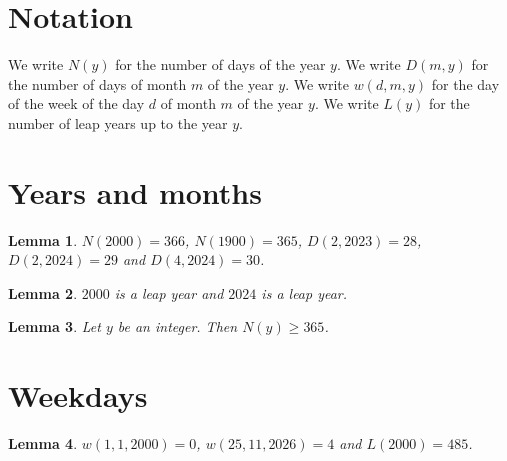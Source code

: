 \documentclass{article}
\newtheorem{lemma}{Lemma}
\begin{document}
\section{Notation}

We write $N(y)$ for the number of days of the year $y$.
We write $D(m,y)$ for the number of days of month $m$ of the year $y$.
We write $w(d,m,y)$ for the day of the week of the day $d$ of month $m$ of the year $y$.
We write $L(y)$ for the number of leap years up to the year $y$.

\section{Years and months}

\begin{lemma}\label{years}
$N(2000)=366$, $N(1900)=365$, $D(2,2023)=28$, $D(2,2024)=29$ and $D(4,2024)=30$.
\end{lemma}

\begin{lemma}\label{leap}
$2000$ is a leap year and $2024$ is a leap year.
\end{lemma}

\begin{lemma}\label{bound}
Let $y$ be an integer. Then $N(y)\ge365$.
\end{lemma}

\section{Weekdays}

\begin{lemma}\label{weekdays}
$w(1,1,2000)=0$, $w(25,11,2026)=4$ and $L(2000)=485$.
\end{lemma}
\end{document}
